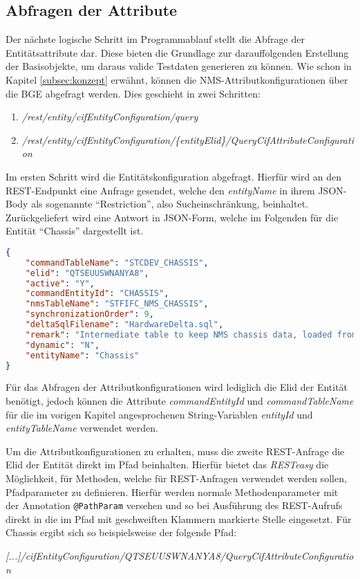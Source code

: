 \subsection{Abfragen der Attribute}\label{subsec:attributes}
Der nächste logische Schritt im Programmablauf stellt die Abfrage der Entitätsattribute dar. Diese bieten die Grundlage zur darauffolgenden Erstellung der Basisobjekte, um daraus valide Testdaten generieren zu können. Wie schon in Kapitel \ref{subsec:konzept} erwähnt, können die \ac{NMS}-Attributkonfigurationen über die \ac{BGE} abgefragt werden. Dies geschieht in zwei Schritten:

\begin{enumerate}
    \item \textit{/rest/entity/cifEntityConfiguration/query}
    \item \textit{/rest/entity/cifEntityConfiguration/\{entityElid\}/QueryCifAttributeConfiguration}
\end{enumerate}

Im ersten Schritt wird die Entitätskonfiguration abgefragt. Hierfür wird an den \ac{REST}-Endpunkt eine Anfrage gesendet, welche den \textit{entityName} in ihrem \ac{JSON}-Body als sogenannte \enquote{Restriction}, also Sucheinschränkung, beinhaltet. Zurückgeliefert wird eine Antwort in \ac{JSON}-Form, welche im Folgenden für die Entität \enquote{Chassis} dargestellt ist.

\begin{lstlisting}[caption=Entitätskonfiguration des Chassis in JSON-Form, label=entityConfigResponse,language=json]
{
    "commandTableName": "STCDEV_CHASSIS",
    "elid": "QTSEUUSWNANYA8",
    "active": "Y",
    "commandEntityId": "CHASSIS",
    "nmsTableName": "STFIFC_NMS_CHASSIS",
    "synchronizationOrder": 9,
    "deltaSqlFilename": "HardwareDelta.sql",
    "remark": "Intermediate table to keep NMS chassis data, loaded from external system",
    "dynamic": "N",
    "entityName": "Chassis"
}
\end{lstlisting}

Für das Abfragen der Attributkonfigurationen wird lediglich die \ac{Elid} der Entität benötigt, jedoch können die Attribute \textit{commandEntityId} und \textit{commandTableName} für die im vorigen Kapitel angesprochenen String-Variablen \textit{entityId} und \textit{entityTableName} verwendet werden.

Um die Attributkonfigurationen zu erhalten, muss die zweite \ac{REST}-Anfrage die \ac{Elid} der Entität direkt im Pfad beinhalten. Hierfür bietet das \textit{RESTeasy} die Möglichkeit, für Methoden, welche für \ac{REST}-Anfragen verwendet werden sollen, Pfadparameter zu definieren. Hierfür werden normale Methodenparameter mit der Annotation \colorbox{background}{\lstinline{@PathParam}} versehen und so bei Ausführung des \ac{REST}-Aufrufs direkt in die im Pfad mit geschweiften Klammern markierte Stelle eingesetzt. Für Chassis ergibt sich so beispielsweise der folgende Pfad: 
\begin{center}
    \textit{[...]/cifEntityConfiguration/QTSEUUSWNANYA8/QueryCifAttributeConfiguration}
\end{center}

